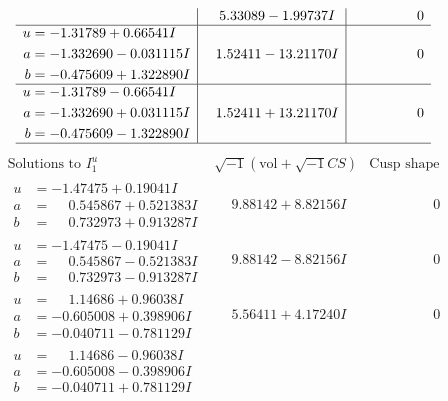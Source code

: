 \documentclass[1p]{elsarticle_modified}
\theoremstyle{definition}
\newcommand{\I}{\sqrt{-1}}
\begin{document}
$$\begin{array}{c|c|c}
 & \phantom{-}5.33089 - 1.99737 I & \phantom{-0.000000 } 0 \\ \hline\begin{aligned}
u &= -1.31789 + 0.66541 I \\
a &= -1.332690 - 0.031115 I \\
b &= -0.475609 + 1.322890 I\end{aligned}
 & \phantom{-}1.52411 - 13.21170 I & \phantom{-0.000000 } 0 \\ \hline\begin{aligned}
u &= -1.31789 - 0.66541 I \\
a &= -1.332690 + 0.031115 I \\
b &= -0.475609 - 1.322890 I\end{aligned}
 & \phantom{-}1.52411 + 13.21170 I & \phantom{-0.000000 } 0\\
 \hline 
 \end{array}$$\newpage$$\begin{array}{c|c|c}  
\text{Solutions to }I^u_{1}& \I (\text{vol} + \sqrt{-1}CS) & \text{Cusp shape}\\
 \hline 
\begin{aligned}
u &= -1.47475 + 0.19041 I \\
a &= \phantom{-}0.545867 + 0.521383 I \\
b &= \phantom{-}0.732973 + 0.913287 I\end{aligned}
 & \phantom{-}9.88142 + 8.82156 I & \phantom{-0.000000 } 0 \\ \hline\begin{aligned}
u &= -1.47475 - 0.19041 I \\
a &= \phantom{-}0.545867 - 0.521383 I \\
b &= \phantom{-}0.732973 - 0.913287 I\end{aligned}
 & \phantom{-}9.88142 - 8.82156 I & \phantom{-0.000000 } 0 \\ \hline\begin{aligned}
u &= \phantom{-}1.14686 + 0.96038 I \\
a &= -0.605008 + 0.398906 I \\
b &= -0.040711 - 0.781129 I\end{aligned}
 & \phantom{-}5.56411 + 4.17240 I & \phantom{-0.000000 } 0 \\ \hline\begin{aligned}
u &= \phantom{-}1.14686 - 0.96038 I \\
a &= -0.605008 - 0.398906 I \\
b &= -0.040711 + 0.781129 I\end{aligned}

\end{array}$$
\end{document}
